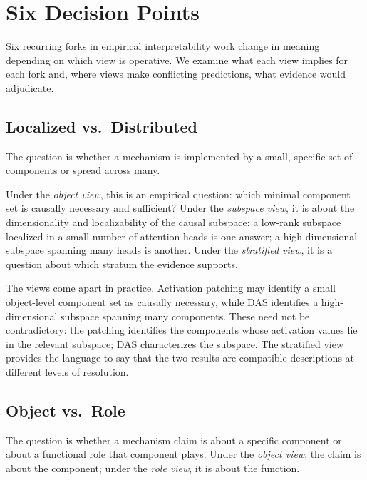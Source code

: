 \documentclass{article}
\begin{document}
\section{Six Decision Points}\label{sec:decisions}

Six recurring forks in empirical interpretability work change in
meaning depending on which view is operative.  We examine what each
view implies for each fork and, where views make conflicting predictions,
what evidence would adjudicate.

\subsection{Localized vs.\ Distributed}

The question is whether a mechanism is implemented by a small, specific
set of components or spread across many.

Under the \emph{object view}, this is an empirical question: which
minimal component set is causally necessary and sufficient?  Under
the \emph{subspace view}, it is about the dimensionality and
localizability of the causal subspace: a low-rank subspace localized
in a small number of attention heads is one answer; a high-dimensional
subspace spanning many heads is another.  Under the \emph{stratified
view}, it is a question about which stratum the evidence supports.

The views come apart in practice.  Activation patching may identify a
small object-level component set as causally necessary, while DAS
identifies a high-dimensional subspace spanning many components.  These
need not be contradictory: the patching identifies the components whose
activation values lie in the relevant subspace; DAS characterizes the
subspace.  The stratified view provides the language to say that the
two results are compatible descriptions at different levels of
resolution.

\subsection{Object vs.\ Role}

The question is whether a mechanism claim is about a specific component
or about a functional role that component plays.  Under the \emph{object
view}, the claim is about the component; under the \emph{role view},
it is about the function.
\end{document}
